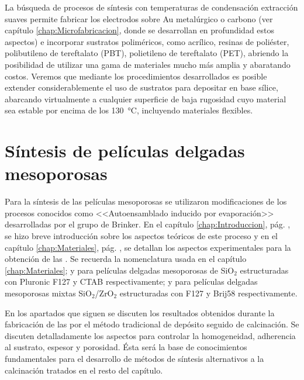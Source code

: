	La búsqueda de procesos de síntesis con temperaturas de condensación extracción suaves permite fabricar los electrodos sobre Au metalúrgico o carbono (ver capítulo \ref{chap:Microfabricacion}, donde se desarrollan en profundidad estos aspectos) e incorporar sustratos poliméricos, como acrílico, resinas de poliéster, polibutileno de tereftalato (PBT), polietileno de tereftalato (PET), abriendo la posibilidad de utilizar una gama de materiales mucho más amplia y abaratando costos. Veremos que mediante los procedimientos desarrollados es posible extender considerablemente el uso de sustratos para depositar \pdm\space en base sílice, abarcando virtualmente a cualquier superficie de baja rugosidad cuyo material sea estable por encima de los \SI{130}{\celsius}, incluyendo materiales flexibles.
	
\section{Síntesis de películas delgadas mesoporosas}
		
		Para la síntesis de las películas mesoporosas se utilizaron modificaciones de los procesos conocidos como <<Autoensamblado inducido por evaporación>> desarrolladas por el grupo de Brinker.\cite{Brinker1999} En el capítulo \ref{chap:Introduccion}, pág. \pageref{sec:mesoporosos}, se hizo breve introducción sobre los aspectos teóricos de este proceso y en el capítulo \ref{chap:Materiales}, pág. \pageref{sec:sintesis_mesoporosos}, se detallan los aspectos experimentales para la obtención de las \pdm. Se recuerda la nomenclatura usada en el capítulo \ref{chap:Materiales}; \pdmF\space y \pdmC\space para películas delgadas mesoporosas de SiO$_2$ estructuradas con Pluronic F127 y CTAB respectivamente; \pdmZ\space y \pdmZB\space para películas delgadas mesoporosas mixtas SiO$_2$/ZrO$_2$ estructuradas con F127 y Brij58 respectivamente.

		En los apartados que siguen se discuten los resultados obtenidos durante la fabricación de las \pdm\space por el método tradicional de depósito seguido de calcinación. Se discuten detalladamente los aspectos para controlar la homogeneidad, adherencia al sustrato, espesor y porosidad. Ésta será la base de conocimientos fundamentales para el desarrollo de métodos de síntesis alternativos a la calcinación tratados en el resto del capítulo.

